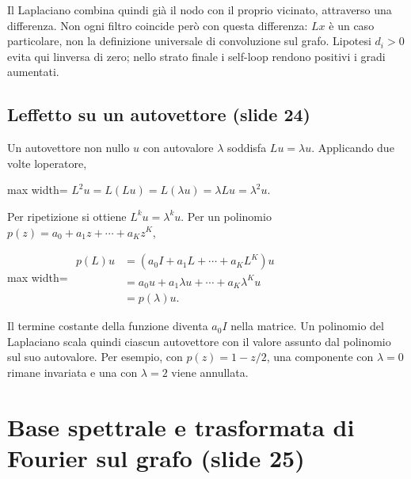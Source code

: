 \documentclass[11pt,a4paper,oneside,openany]{book}
\begin{document}
Il Laplaciano combina quindi già il nodo con il proprio vicinato, attraverso una differenza. Non ogni filtro coincide però con questa differenza: \(Lx\) è un caso particolare, non la definizione universale di convoluzione sul grafo. L\textquotesingle ipotesi \(d_i>0\) evita qui l\textquotesingle inversa di zero; nello strato finale i self-loop rendono positivi i gradi aumentati.

\subsection{L\textquotesingle effetto su un autovettore (slide 24)}\label{f05-r319}

Un autovettore non nullo \(u\) con autovalore \(\lambda\) soddisfa \(Lu=\lambda u\). Applicando due volte l\textquotesingle operatore,

\begin{center}
\begin{adjustbox}{max width=\linewidth}
$\displaystyle L^2u=L(Lu)=L(\lambda u)=\lambda Lu=\lambda^2u.$
\end{adjustbox}
\end{center}

Per ripetizione si ottiene \(L^ku=\lambda^ku\). Per un polinomio \(p(z)=a_0+a_1z+\cdots+a_Kz^K\),

\begin{center}
\begin{adjustbox}{max width=\linewidth}
$\displaystyle \begin{aligned}
p(L)u&=(a_0I+a_1L+\cdots+a_KL^K)u\\
&=a_0u+a_1\lambda u+\cdots+a_K\lambda^Ku\\
&=p(\lambda)u.
\end{aligned}$
\end{adjustbox}
\end{center}

Il termine costante della funzione diventa \(a_0I\) nella matrice. Un polinomio del Laplaciano scala quindi ciascun autovettore con il valore assunto dal polinomio sul suo autovalore. Per esempio, con \(p(z)=1-z/2\), una componente con \(\lambda=0\) rimane invariata e una con \(\lambda=2\) viene annullata.

\section{Base spettrale e trasformata di Fourier sul grafo (slide 25)}\label{f05-r335}
\end{document}
